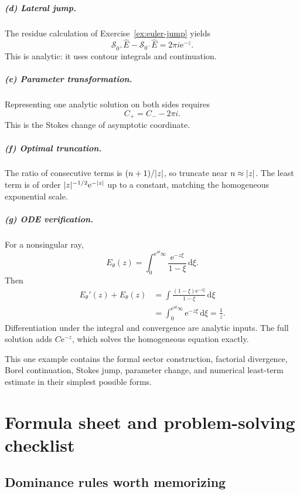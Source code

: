 \documentclass[11pt,oneside]{book}
\theoremstyle{definition}
\theoremstyle{remark}
\newcommand{\e}{\mathrm{e}}
\newcommand{\dd}{\,\mathrm{d}}
\DeclarePairedDelimiter{\abs}{\lvert}{\rvert}
\begin{document}
\paragraph{(d) Lateral jump.}
The residue calculation of Exercise~\ref{ex:euler-jump} yields
\[
  \mathcal S_{0^+}\widehat E-
  \mathcal S_{0^-}\widehat E=2\pi i\e^{-z}.
\]
This is analytic: it uses contour integrals and continuation.

\paragraph{(e) Parameter transformation.}
Representing one analytic solution on both sides requires
\[
  C_+=C_--2\pi i.
\]
This is the Stokes change of asymptotic coordinate.

\paragraph{(f) Optimal truncation.}
The ratio of consecutive terms is $(n+1)/\abs z$, so truncate near
$n\approx\abs z$. The least term is of order
$\abs z^{-1/2}\e^{-\abs z}$ up to a constant, matching the homogeneous
exponential scale.

\paragraph{(g) ODE verification.}
For a nonsingular ray,
\[
  E_\theta(z)=\int_0^{\e^{i\theta}\infty}
  \frac{\e^{-z\xi}}{1-\xi}\dd\xi.
\]
Then
\begin{align*}
  E_\theta'(z)+E_\theta(z)
  &=\int
    \frac{(1-\xi)\e^{-z\xi}}{1-\xi}\dd\xi\\
  &=\int_0^{\e^{i\theta}\infty}\e^{-z\xi}\dd\xi
   =\frac1z.
\end{align*}
Differentiation under the integral and convergence are analytic inputs. The full
solution adds $C\e^{-z}$, which solves the homogeneous equation exactly.

This one example contains the formal sector construction, factorial divergence,
Borel continuation, Stokes jump, parameter change, and numerical least-term
estimate in their simplest possible forms.

\chapter{Formula sheet and problem-solving checklist}
\label{ch:formula-sheet}

\section{Dominance rules worth memorizing}
\end{document}
